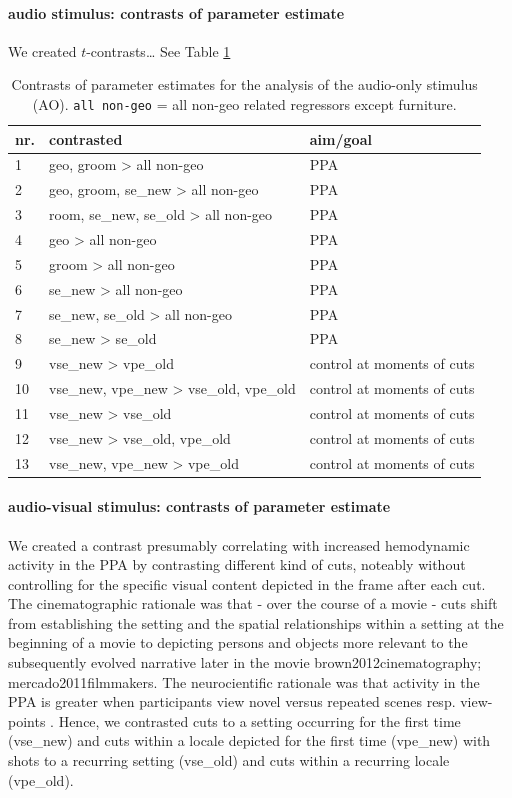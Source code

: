 \documentclass[english]{article}
\begin{document}
\paragraph{audio stimulus: contrasts of parameter estimate}
We created $t$-contrasts\dots
See Table \ref{tab:ao-contrasts}

\begin{table}[t]
\caption{Contrasts of parameter estimates for the analysis of the audio-only
    stimulus (AO).
\texttt{all non-geo} = all non-geo related regressors except furniture.}
\label{tab:ao-contrasts}
\footnotesize
\begin{tabular}{lll}
\toprule
\textbf{nr.} &  \textbf{contrasted} & \textbf{aim/goal} \\
\midrule
1 & geo, groom > all non-geo & PPA \tabularnewline
2 & geo, groom, se\_new > all non-geo & PPA \tabularnewline
3 & room, se\_new, se\_old > all non-geo & PPA \tabularnewline
4 & geo > all non-geo & PPA \tabularnewline
5 & groom > all non-geo & PPA \tabularnewline
6 & se\_new > all non-geo & PPA \tabularnewline
7 & se\_new, se\_old > all non-geo & PPA \tabularnewline
8 & se\_new > se\_old & PPA \tabularnewline
9 & vse\_new > vpe\_old & control at moments of cuts \tabularnewline
10 & vse\_new, vpe\_new > vse\_old, vpe\_old & control at moments of cuts \tabularnewline
11 & vse\_new > vse\_old & control at moments of cuts \tabularnewline
12 & vse\_new > vse\_old, vpe\_old & control at moments of cuts \tabularnewline
13 & vse\_new, vpe\_new > vpe\_old & control at moments of cuts \tabularnewline
\end{tabular}
\end{table}


\paragraph{audio-visual stimulus: contrasts of parameter estimate}
We created a contrast presumably correlating with increased hemodynamic activity
in the PPA by contrasting different kind of cuts, noteably without controlling
for the specific visual content depicted in the frame after each cut.
The cinematographic rationale was that - over the course of a movie - cuts shift
from establishing the setting and the spatial relationships within a setting at
the beginning of a movie to depicting persons and objects more relevant to the
subsequently evolved narrative later in the movie {brown2012cinematography;
mercado2011filmmakers}.
The neurocientific rationale was that activity in the PPA is greater when
participants view novel versus repeated scenes resp. view-points
\citep{epstein1999parahippocampal}.
Hence, we contrasted cuts to a setting occurring for the first time (vse\_new)
and cuts within a locale depicted for the first time (vpe\_new) with shots to a
recurring setting (vse\_old) and cuts within a recurring locale (vpe\_old).
\end{document}
